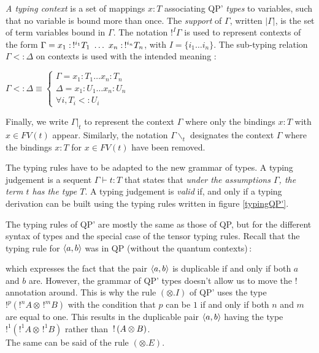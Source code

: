\begin{defn} \textit{A typing context} is a set of mappings $x : T$ associating QP' \textit{types} to variables, such that no variable is bound
	more than once. The \textit{support} of $\Gamma$, written $|\Gamma|$, is the set of term variables bound in $\Gamma$.
	The notation $!^I \Gamma$ is used to represent contexts of the form
	$\Gamma = x_1 : \,!^{i_1} T_1 ~ \dots ~ x_n : \,!^{i_n} T_n$, with $I = \{i_1 \dots i_n\}$.
	The sub-typing relation $\Gamma <: \Delta$ on contexts is used with the intended meaning :
		\begin{center}
			$\Gamma <: \Delta \equiv \left\{ \begin{array}{l}
																						\Gamma = x_1 : T_1 \dots x_n : T_n \\
																						\Delta = x_1 : U_1 \dots x_n : U_n \\
																						\forall i, T_i <: U_i
																					\end{array}	 \right.$
		\end{center}
	Finally, we write $\Gamma|_t$ to represent the context $\Gamma$ where only the bindings $x : T$ with $x \in FV(t)$ appear.
	Similarly, the notation $\Gamma \backslash_t$ designates the context $\Gamma$ where the bindings $x : T$ for $x \in FV(t)$ have been
	removed.
\end{defn}

\begin{defn} The typing rules have to be adapted to the new grammar of types. A typing judgement is a sequent
	$\Gamma \vdash t : T$ that states that \textit{under the assumptions $\Gamma$, the term $t$ has the type $T$}. A typing judgement
	is \textit{valid} if, and only if a typing derivation can be built using the typing rules written in figure \ref{typingQP'}.
\end{defn}

\begin{remark} The typing rules of QP' are mostly the same as those of QP, but for the different syntax of types and the special
	case of the tensor typing rules. Recall that the typing rule for $\langle a, b \rangle$ was in QP (without the quantum contexts)\,:
		\begin{prooftree}
		\end{prooftree}
	which expresses the fact that the pair $\langle a, b \rangle$ is duplicable if and only if both $a$ and $b$ are. However, the grammar of QP' types
	doesn't allow us to move the $!$ annotation around. This is why the rule $(\otimes.I)$ of QP' uses the type $!^p(!^nA \otimes \,!^mB)$ with
	the condition that $p$ can be $1$ if and only if both $n$ and $m$ are equal to one. This results in the duplicable pair $\langle a, b \rangle$ having the
	type $!^1(!^1 A \otimes \,!^1B)$ rather than $\,!\, (A \otimes B)$. \\
	The same can be said of the rule $(\otimes.E)$.
\end{remark}

